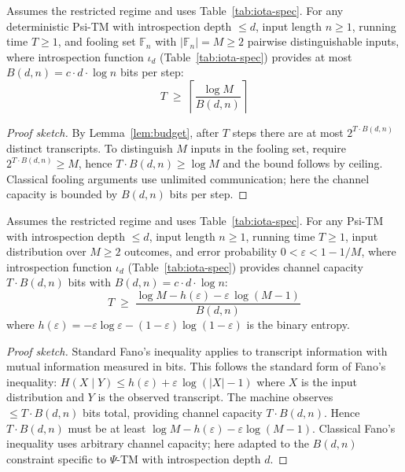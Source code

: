 \begin{lemma}
\label{lem:psi-fooling}
Assumes the restricted regime and uses Table~\ref{tab:iota-spec}.
For any deterministic Psi-TM with introspection depth $\leq d$, input length $n \geq 1$, running time $T \geq 1$, and fooling set $\mathbb{F}_n$ with $|\mathbb{F}_n| = M \geq 2$ pairwise distinguishable inputs, where introspection function $\iota_d$ (Table~\ref{tab:iota-spec}) provides at most $B(d,n) = c \cdot d \cdot \log n$ bits per step:
\begin{equation}
\label{eq:fooling-bound}
T \;\geq\; \left\lceil \frac{\log M}{B(d,n)} \right\rceil
\end{equation}
\end{lemma}

\begin{proof}[Proof sketch]
By Lemma~\ref{lem:budget}, after $T$ steps there are at most $2^{T \cdot B(d,n)}$ distinct transcripts. To distinguish $M$ inputs in the fooling set, require $2^{T \cdot B(d,n)} \ge M$, hence $T \cdot B(d,n) \ge \log M$ and the bound follows by ceiling. Classical fooling arguments use unlimited communication; here the channel capacity is bounded by $B(d,n)$ bits per step.
\end{proof}

\begin{lemma}
\label{lem:psi-fano}
Assumes the restricted regime and uses Table~\ref{tab:iota-spec}.
For any Psi-TM with introspection depth $\leq d$, input length $n \geq 1$, running time $T \geq 1$, input distribution over $M \geq 2$ outcomes, and error probability $0 < \varepsilon < 1 - 1/M$, where introspection function $\iota_d$ (Table~\ref{tab:iota-spec}) provides channel capacity $T \cdot B(d,n)$ bits with $B(d,n) = c \cdot d \cdot \log n$:
\begin{equation}
\label{eq:fano-bound}
T \;\geq\; \frac{\log M - h(\varepsilon) - \varepsilon\,\log(M-1)}{B(d,n)}
\end{equation}
where $h(\varepsilon) = -\varepsilon \log \varepsilon - (1-\varepsilon) \log(1-\varepsilon)$ is the binary entropy.
\end{lemma}

\begin{proof}[Proof sketch]
Standard Fano's inequality applies to transcript information with mutual information measured in bits. This follows the standard form of Fano's inequality: $H(X\mid Y) \leq h(\varepsilon) + \varepsilon \, \log(|X|-1)$ where $X$ is the input distribution and $Y$ is the observed transcript. The machine observes $\leq T \cdot B(d,n)$ bits total, providing channel capacity $T \cdot B(d,n)$. Hence $T \cdot B(d,n)$ must be at least $\log M - h(\varepsilon) - \varepsilon \log(M-1)$. Classical Fano's inequality uses arbitrary channel capacity; here adapted to the $B(d,n)$ constraint specific to $\Psi$-TM with introspection depth $d$.
\end{proof}

